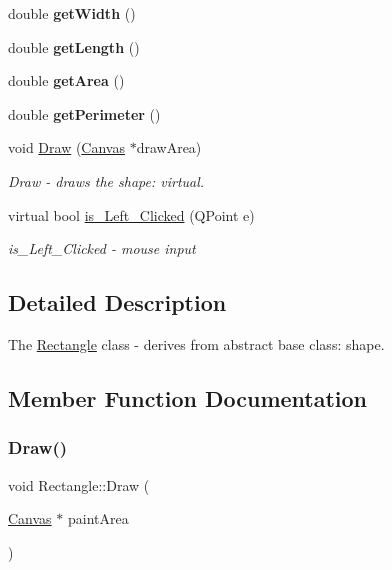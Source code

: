 \begin{DoxyCompactItemize}
double {\bfseries get\+Width} ()
\item 
\mbox{\label{class_rectangle_a64b31e74ec44911d5fb567f4be9cc1da}} 
double {\bfseries get\+Length} ()
\item 
\mbox{\label{class_rectangle_afcc7d35ebcfbd504f3a7d7c78ef425bc}} 
double {\bfseries get\+Area} ()
\item 
\mbox{\label{class_rectangle_ad173a67339cc3f7c1590c71a07b6d08d}} 
double {\bfseries get\+Perimeter} ()
\item 
void \hyperlink{class_rectangle_afe989f9ae3ceffd9825b4f1492d764f3}{Draw} (\hyperlink{class_canvas}{Canvas} $\ast$draw\+Area)
\begin{DoxyCompactList}\small\item\em Draw -\/ draws the shape\+: virtual. \end{DoxyCompactList}\item 
virtual bool \hyperlink{class_rectangle_ade126ee824e394b9c38d2e67a30d1a7d}{is\+\_\+\+Left\+\_\+\+Clicked} (Q\+Point e)
\begin{DoxyCompactList}\small\item\em is\+\_\+\+Left\+\_\+\+Clicked -\/ mouse input \end{DoxyCompactList}\end{DoxyCompactItemize}


\subsection{Detailed Description}
The \hyperlink{class_rectangle}{Rectangle} class -\/ derives from abstract base class\+: shape. 

\subsection{Member Function Documentation}
\mbox{\label{class_rectangle_afe989f9ae3ceffd9825b4f1492d764f3}} 
\subsubsection{\texorpdfstring{Draw()}{Draw()}}
{\footnotesize\ttfamily void Rectangle\+::\+Draw (\begin{DoxyParamCaption}\item[{\hyperlink{class_canvas}{Canvas} $\ast$}]{paint\+Area }\end{DoxyParamCaption})\hspace{0.3cm}{\ttfamily [virtual]}}



